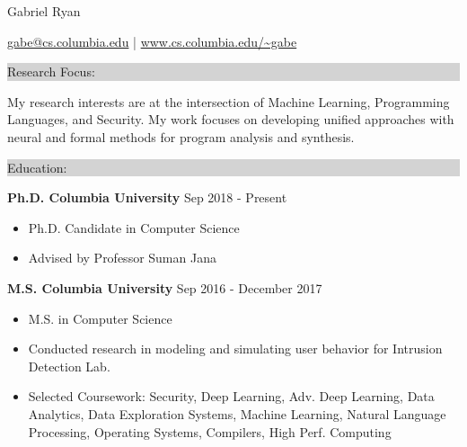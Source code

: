 \documentclass{article} %
\newcommand{\rsection}[1]{
  \hspace{-0.4cm}\vspace{0.1cm}
\colorbox{lightgrey}{
\begin{minipage}{1.07\linewidth}
\vspace{0.22cm}
\fontsize{14pt}{16pt}\selectfont #1
\vspace{0.12cm}
\end{minipage}
}
\vspace*{-0.1cm}
}
\newcommand{\rjob}[2]{
  \hspace*{-0.3cm}
{\fontsize{10pt}{12pt}\selectfont #1} \hfill #2
\vspace*{0.1cm}
\hspace*{-1.2cm}
}
\newenvironment{ritemize}{
\hspace*{-0.8cm}
\begin{minipage}{1.05\linewidth}
\begin{itemize}
}{
\end{itemize}
\end{minipage}
}
\newcommand{\ritem}{
\item[-]
}
\begin{document}
\hspace*{-0.45cm}
{\fontsize{22pt}{22pt}\selectfont Gabriel Ryan}\\
\begin{minipage}{\linewidth}
\vspace{0.1cm}
  {\fontsize{12}{12}\selectfont
      \href{mailto:gabe@cs.columbia.edu}{gabe@cs.columbia.edu} | \url{www.cs.columbia.edu/~gabe}
  }
\end{minipage}
\vspace{-0.15cm}

\rsection{Research Focus:}

My research interests are at the intersection of Machine Learning, Programming Languages, and Security. My work focuses on developing unified approaches with neural and formal methods for program analysis and synthesis.


\rsection{Education:}

\rjob{\textbf{Ph.D. Columbia University}}{Sep 2018 - Present}\\
\begin{ritemize}
\ritem Ph.D. Candidate in Computer Science
\ritem Advised by Professor Suman Jana
\end{ritemize}

\rjob{\textbf{M.S. Columbia University}}{Sep 2016 - December 2017}\\
\begin{ritemize}
  \ritem M.S. in Computer Science %
  \ritem Conducted research in modeling and simulating user behavior for Intrusion Detection Lab.
  \ritem Selected Coursework: Security, Deep Learning, Adv. Deep Learning, Data Analytics, Data Exploration Systems, Machine Learning, Natural Language Processing, Operating Systems, Compilers, High Perf. Computing
\end{ritemize}
\end{document}
